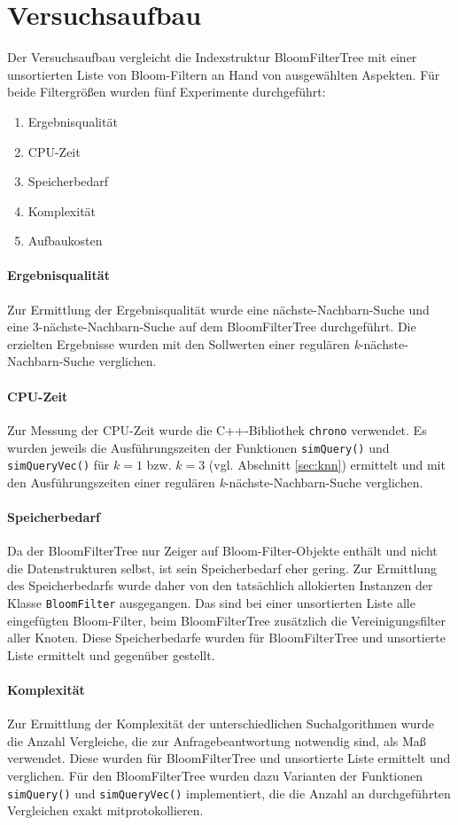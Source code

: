 \section{Versuchsaufbau}\label{sec:versuchsaufbau}
Der Versuchsaufbau vergleicht die Indexstruktur BloomFilterTree mit einer unsortierten Liste von Bloom-Filtern an Hand von ausgewählten Aspekten. Für beide Filtergrößen wurden fünf Experimente durchgeführt:  
\begin{enumerate}
	\item Ergebnisqualität
	\item CPU-Zeit 
	\item Speicherbedarf 
	\item Komplexität 
	\item Aufbaukosten 
\end{enumerate}
\paragraph*{Ergebnisqualität}
Zur Ermittlung der Ergebnisqualität wurde eine nächste-Nachbarn-Suche und eine 3-nächste-Nachbarn-Suche auf dem BloomFilterTree durchgeführt. Die erzielten Ergebnisse wurden mit den Sollwerten einer regulären \textit{k}-nächste-Nachbarn-Suche verglichen. 
\paragraph*{CPU-Zeit}
Zur Messung der CPU-Zeit wurde die C++-Bibliothek \texttt{chrono} verwendet. Es wurden jeweils die Ausführungszeiten der Funktionen \texttt{simQuery()} und \texttt{simQueryVec()} für $k=1$ bzw. $k=3$ (vgl. Abschnitt \ref{sec:knn}) ermittelt und mit den Ausführungszeiten einer regulären \textit{k}-nächste-Nachbarn-Suche verglichen.
\paragraph*{Speicherbedarf} 
Da der BloomFilterTree nur Zeiger auf Bloom-Filter-Objekte enthält und nicht die Datenstrukturen selbst, ist sein Speicherbedarf eher gering. Zur Ermittlung des Speicherbedarfs wurde daher von den tatsächlich allokierten Instanzen der Klasse \texttt{BloomFilter} ausgegangen. Das sind bei einer unsortierten Liste alle eingefügten Bloom-Filter, beim BloomFilterTree zusätzlich die Vereinigungsfilter aller Knoten. Diese Speicherbedarfe wurden für BloomFilterTree und unsortierte Liste ermittelt und gegenüber gestellt. 
\paragraph*{Komplexität}
Zur Ermittlung der Komplexität der unterschiedlichen Suchalgorithmen wurde die Anzahl Vergleiche, die zur Anfragebeantwortung notwendig sind, als Maß verwendet. Diese wurden für BloomFilterTree und unsortierte Liste ermittelt und verglichen. Für den BloomFilterTree wurden dazu Varianten der Funktionen \texttt{simQuery()} und \texttt{simQueryVec()} implementiert, die die Anzahl an durchgeführten Vergleichen exakt mitprotokollieren.   
